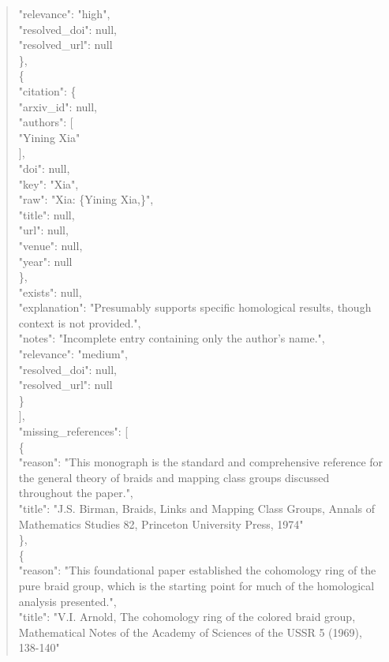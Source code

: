 \documentclass[11pt]{article}
\begin{document}
\begin{quote}
      "relevance": "high",\\
      "resolved\_doi": null,\\
      "resolved\_url": null\\
    \},\\
    \{\\
      "citation": \{\\
        "arxiv\_id": null,\\
        "authors": [\\
          "Yining Xia"\\
        ],\\
        "doi": null,\\
        "key": "Xia",\\
        "raw": "Xia: \{Yining Xia,\}",\\
        "title": null,\\
        "url": null,\\
        "venue": null,\\
        "year": null\\
      \},\\
      "exists": null,\\
      "explanation": "Presumably supports specific homological results, though context is not provided.",\\
      "notes": "Incomplete entry containing only the author's name.",\\
      "relevance": "medium",\\
      "resolved\_doi": null,\\
      "resolved\_url": null\\
    \}\\
  ],\\
  "missing\_references": [\\
    \{\\
      "reason": "This monograph is the standard and comprehensive reference for the general theory of braids and mapping class groups discussed throughout the paper.",\\
      "title": "J.S. Birman, Braids, Links and Mapping Class Groups, Annals of Mathematics Studies 82, Princeton University Press, 1974"\\
    \},\\
    \{\\
      "reason": "This foundational paper established the cohomology ring of the pure braid group, which is the starting point for much of the homological analysis presented.",\\
      "title": "V.I. Arnold, The cohomology ring of the colored braid group, Mathematical Notes of the Academy of Sciences of the USSR 5 (1969), 138-140"\\

\end{quote}
\end{document}
